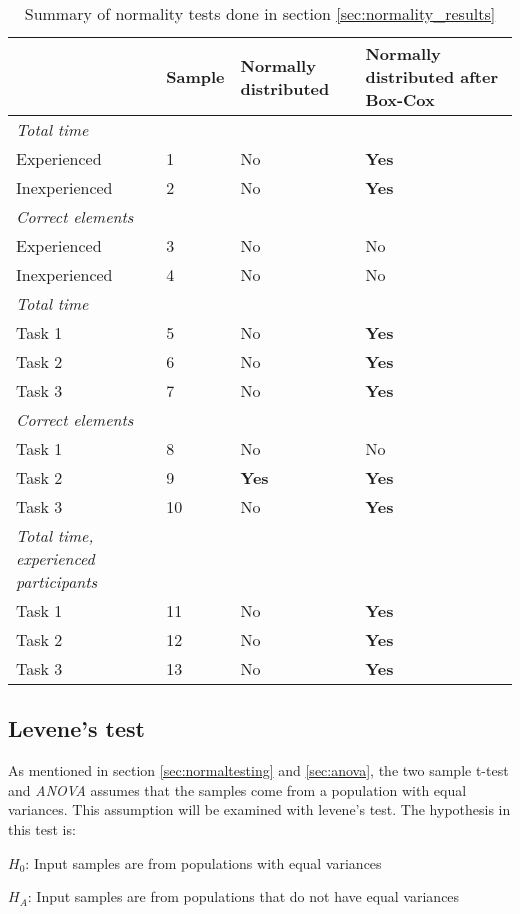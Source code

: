 	\begin{longtable}{p{}|l|p{2cm}|p{}}
	\caption[Summary, normality tests]{Summary of normality tests done in section \ref{sec:normality_results}} \label{tab:normaltest_summary} \\
		  & Sample & Normally distributed  & Normally distributed after Box-Cox  \\ \hline
		\textit{Total time} & & & \\
		Experienced & 1 &No   & \textbf{Yes}   \\
		Inexperienced  & 2 & No & \textbf{Yes}     \\ \hline
		\textit{Correct elements} & & & \\
		Experienced & 3 & No  & No   \\
		Inexperienced  & 4 & No & No   \\ \hline
		\textit{Total time }& & & \\
		Task 1 & 5 &No  & \textbf{Yes}  \\
		Task 2 & 6 &No  & \textbf{Yes}   \\
		Task 3 & 7 & No & \textbf{Yes}  \\ \hline
		\textit{Correct elements} & & & \\
		Task 1 & 8 & No  & No  \\
		Task 2 & 9 &\textbf{Yes}  & \textbf{Yes}   \\
		Task 3 & 10 & No & \textbf{Yes}  \\ \hline
		\textit{Total time, experienced participants} & & & \\
		Task 1 & 11 & No  & \textbf{Yes}  \\
		Task 2 & 12 & No  & \textbf{Yes}   \\
		Task 3 & 13 & No & \textbf{Yes}  \\ \hline
	\end{longtable}

\subsection{Levene's test}
As mentioned in section \ref{sec:normaltesting} and \ref{sec:anova}, the two sample t-test and \textit{ANOVA} assumes that the samples come from a population with equal variances. This assumption will be examined with levene's test. The hypothesis in this test is: \\[0.5cm]

\centerline{$H_{0}$: Input samples are from populations with equal variances} 
\centerline{$H_{A}$: Input samples are from populations that do not have equal variances}

